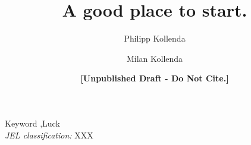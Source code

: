 

\begin{frontmatter}
	\title{A good place to start.}
	
	\author[1]{Philipp Kollenda}
	\author{Milan Kollenda}
	\author{\textbf{[Unpublished Draft - Do Not Cite.]}}
	\address[1]{School of Business and Economics, Vrije Universiteit Amsterdam, De Boelelaan 1105, 1081 HV Amsterdam, The Netherlands}
	
	\begin{abstract}
		\noindent \lipsum[1]
	\end{abstract}
	
	\begin{keyword}
		Keyword  \sep Luck \\
		\textit{JEL classification:} XXX
	\end{keyword}
	
\end{frontmatter}